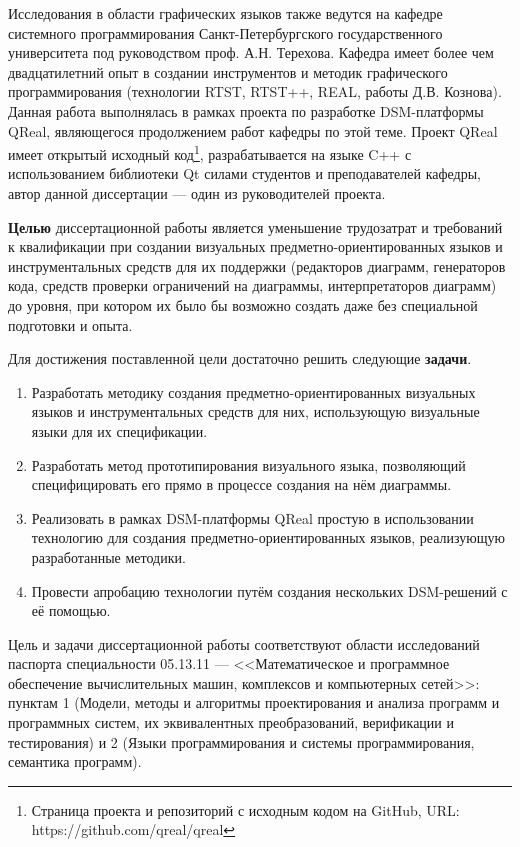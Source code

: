 Исследования в области графических языков также ведутся на кафедре системного программирования
Санкт-Петербургского государственного университета под руководством проф. А.Н. Терехова.
Кафедра имеет более чем двадцатилетний опыт в создании инструментов и методик графического
программирования (технологии RTST, RTST++, REAL, работы Д.В. Кознова). Данная работа 
выполнялась в рамках проекта по разработке DSM-платформы QReal, являющегося продолжением
работ кафедры по этой теме. Проект QReal имеет открытый исходный код\footnote{Страница 
проекта и репозиторий с исходным кодом на GitHub, URL: https://github.com/qreal/qreal}, 
разрабатывается на языке C++ с использованием библиотеки Qt силами студентов и преподавателей 
кафедры, автор данной диссертации --- один из руководителей проекта.

\textbf{Целью} диссертационной работы является уменьшение трудозатрат и требований к квалификации
при создании визуальных предметно-ориентированных языков и инструментальных средств для их поддержки 
(редакторов диаграмм, генераторов кода, средств проверки ограничений на диаграммы, интерпретаторов диаграмм)
до уровня, при котором их было бы возможно создать даже без специальной подготовки и опыта.

Для достижения поставленной цели достаточно решить следующие \textbf{задачи}.
\begin{enumerate}
	\item Разработать методику создания предметно-ориентированных визуальных языков и инструментальных 
		средств для них, использующую визуальные языки для их спецификации.
	\item Разработать метод прототипирования визуального языка, позволяющий специфицировать его
		прямо в процессе создания на нём диаграммы.
	\item Реализовать в рамках DSM-платформы QReal простую в использовании технологию 
		для создания предметно-ориентированных языков, реализующую разработанные методики.
	\item Провести апробацию технологии путём создания нескольких DSM-решений с её помощью.
\end{enumerate}

Цель и задачи диссертационной работы соответствуют области исследований паспорта специальности 
05.13.11 --- <<Математическое и программное обеспечение вычислительных машин, комплексов и компьютерных сетей>>: 
пунктам 1 (Модели, методы и алгоритмы проектирования и анализа программ и программных 
систем, их эквивалентных преобразований, верификации и тестирования) и 2 (Языки программирования 
и системы программирования, семантика программ).

